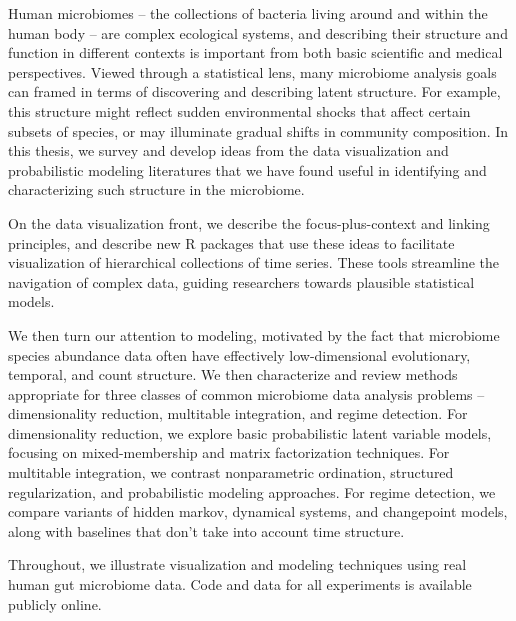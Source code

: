 
Human microbiomes -- the collections of bacteria living around and within the
human body -- are complex ecological systems, and describing their structure and
function in different contexts is important from both basic scientific and
medical perspectives. Viewed through a statistical lens, many microbiome
analysis goals can framed in terms of discovering and describing latent
structure. For example, this structure might reflect sudden environmental shocks
that affect certain subsets of species, or may illuminate gradual shifts in
community composition. In this thesis, we survey and develop ideas from the data
visualization and probabilistic modeling literatures that we have found useful
in identifying and characterizing such structure in the microbiome.

On the data visualization front, we describe the focus-plus-context and linking
principles, and describe new R packages that use these ideas to facilitate
visualization of hierarchical collections of time series. These tools streamline
the navigation of complex data, guiding researchers towards plausible
statistical models.

We then turn our attention to modeling, motivated by the fact that microbiome
species abundance data often have effectively low-dimensional evolutionary,
temporal, and count structure. We then characterize and review methods
appropriate for three classes of common microbiome data analysis problems --
dimensionality reduction, multitable integration, and regime detection. For
dimensionality reduction, we explore basic probabilistic latent variable models,
focusing on mixed-membership and matrix factorization techniques. For multitable
integration, we contrast nonparametric ordination, structured regularization,
and probabilistic modeling approaches. For regime detection, we compare variants
of hidden markov, dynamical systems, and changepoint models, along with
baselines that don't take into account time structure.

Throughout, we illustrate visualization and modeling techniques using real human
gut microbiome data. Code and data for all experiments is available publicly
online.
